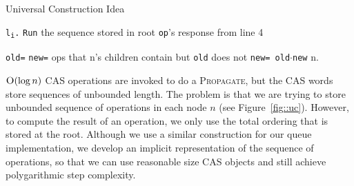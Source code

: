 \documentclass[10pt]{article}
\theoremstyle{definition}
\begin{document}
\begin{algorithm}
\caption{Universal Construction Idea}\label{alg1}
\begin{algorithmic}[1]
\begin{multicols}{2}

\State \texttt{l\textsubscript{i}.}
\State {}
\State \texttt{Run} \textsf{the sequence stored in root}
\State \texttt{\Return op}\textsf{'s response from line 4}

\Statex

 \Return
{}
\State {} \EndIf
\State {}

\columnbreak

\State \texttt{old=} 
\State \texttt{new=} \textsf{ops that n's children contain but \texttt{old} does not}
\State \texttt{new= old$\cdot$new}
\State \Return n.

\end{multicols}
\end{algorithmic}
\end{algorithm}

$\textsc{O}(\log n)$ CAS operations are invoked to do a \textsc{Propagate}, but the CAS words store sequences of unbounded length.
The problem is that we are trying to store unbounded sequence of operations in each node $n$ (see Figure~\ref{fig::uc}). However, to compute the result of an operation, we only use the total ordering that is stored at the root. Although we use a similar construction for our queue implementation, we develop an implicit representation of the sequence of operations, so that we can use reasonable size CAS objects and still achieve polygarithmic step complexity.
\end{document}
